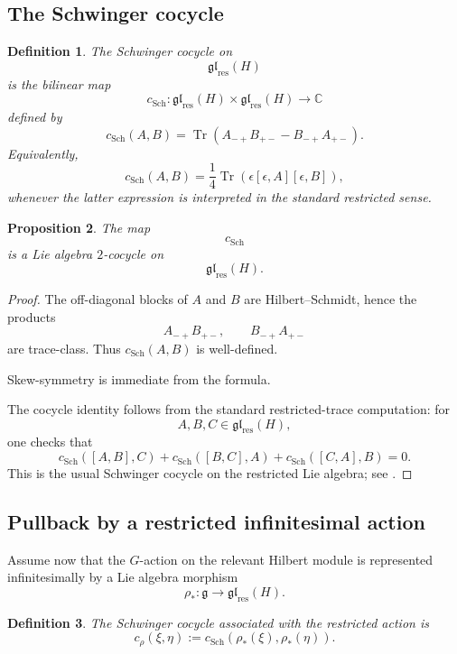 \documentclass[11pt]{amsart}
\newtheorem{definition}{Definition}[section]
\newtheorem{proposition}[definition]{Proposition}
\begin{document}
\subsection{The Schwinger cocycle}

\begin{definition}
The Schwinger cocycle on
\[
\mathfrak{gl}_{\mathrm{res}}(H)
\]
is the bilinear map
\[
c_{\mathrm{Sch}}:
\mathfrak{gl}_{\mathrm{res}}(H)\times
\mathfrak{gl}_{\mathrm{res}}(H)
\longrightarrow
\mathbb C
\]
defined by
\[
c_{\mathrm{Sch}}(A,B)
=
\operatorname{Tr}
\left(
A_{-+}B_{+-}
-
B_{-+}A_{+-}
\right).
\]
Equivalently,
\[
c_{\mathrm{Sch}}(A,B)
=
\frac14\operatorname{Tr}
\left(
\epsilon[\epsilon,A][\epsilon,B]
\right),
\]
whenever the latter expression is interpreted in the standard restricted
sense.
\end{definition}

\begin{proposition}
The map
\[
c_{\mathrm{Sch}}
\]
is a Lie algebra \(2\)-cocycle on
\[
\mathfrak{gl}_{\mathrm{res}}(H).
\]
\end{proposition}

\begin{proof}
The off-diagonal blocks of \(A\) and \(B\) are Hilbert--Schmidt, hence the
products
\[
A_{-+}B_{+-},
\qquad
B_{-+}A_{+-}
\]
are trace-class. Thus \(c_{\mathrm{Sch}}(A,B)\) is well-defined.

Skew-symmetry is immediate from the formula.

The cocycle identity follows from the standard restricted-trace computation:
for
\[
A,B,C\in\mathfrak{gl}_{\mathrm{res}}(H),
\]
one checks that
\[
c_{\mathrm{Sch}}([A,B],C)
+
c_{\mathrm{Sch}}([B,C],A)
+
c_{\mathrm{Sch}}([C,A],B)
=
0.
\]
This is the usual Schwinger cocycle on the restricted Lie algebra; see
\cite{PressleySegal1986}.
\end{proof}

\subsection{Pullback by a restricted infinitesimal action}

Assume now that the \(G\)-action on the relevant Hilbert module is represented
infinitesimally by a Lie algebra morphism
\[
\rho_*:\mathfrak g\longrightarrow \mathfrak{gl}_{\mathrm{res}}(H).
\]

\begin{definition}
The Schwinger cocycle associated with the restricted action is
\[
c_\rho(\xi,\eta)
:=
c_{\mathrm{Sch}}(\rho_*(\xi),\rho_*(\eta)).
\]
\end{definition}
\end{document}
